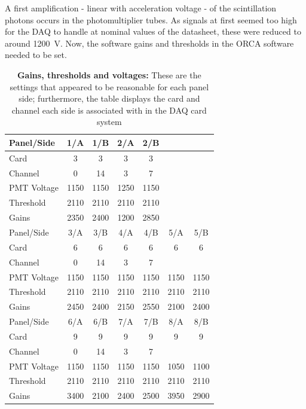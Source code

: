   A first amplification - linear with acceleration voltage - of the scintillation photons occurs in the photomultiplier tubes. As signals at first seemed too high for the DAQ to handle at nominal values of the datasheet, these were reduced to around \SI{1200}{\volt}. Now, the software gains and thresholds in the ORCA software needed to be set. 
    \begin{table}
    
    \centering
    \begin{tabular}{|l|cccccc|}
      \hline
      Panel/Side 	&1/A 	&1/B	&2/A	&2/B	&	&	\\
      \hline
      Card 	&3	&3	&3	&3	&	&	\\
      Channel	&0	&14	&3	&7	&	&	\\
      PMT Voltage	&1150	&1150	&1250	&1150	&	&	\\
      Threshold	&2110	&2110	&2110	&2110	&	&	\\
      Gains	&2350	&2400	&1200	&2850	&	&	\\
      \hline
      Panel/Side 	&3/A 	&3/B	&4/A	&4/B	&5/A	&5/B	\\
      \hline
      Card 	&6	&6	&6	&6	&6	&6	\\
      Channel	&0	&14	&3	&7	&	&	\\
      PMT Voltage	&1150	&1150	&1150	&1150	&1150	&1150   \\
      Threshold	&2110	&2110	&2110	&2110	&2110	&2110   \\
      Gains	&2450	&2400	&2150	&2550	&2100	&2400   \\
      \hline
      Panel/Side 	&6/A 	&6/B	&7/A	&7/B	&8/A	&8/B	\\
      \hline
      Card 	&9	&9	&9	&9	&9	&9	\\
      Channel	&0	&14	&3	&7	&	&	\\
      PMT Voltage	&1150	&1150	&1150	&1150	&1050	&1100	\\
      Threshold	&2110	&2110	&2110	&2110	&2110	&2110   \\
      Gains	&3400	&2100	&2400	&2500	&3950	&2900   \\
      \hline
    

   \end{tabular}
  \caption{{\bf Gains, thresholds and voltages:} These are the settings that appeared to be reasonable for each panel side; furthermore, the table displays the card and channel each side is associated with in the DAQ card system}
  \end{table}
  
